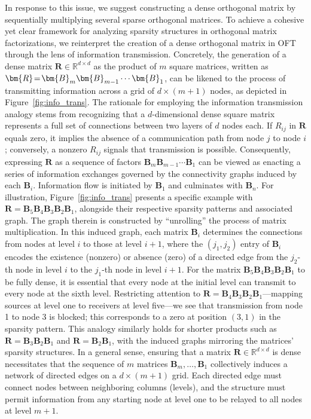 In response to this issue, we suggest constructing a dense orthogonal matrix by sequentially multiplying several sparse orthogonal matrices. To achieve a cohesive yet clear framework for analyzing sparsity structures in orthogonal matrix factorizations, we reinterpret the creation of a dense orthogonal matrix in OFT through the lens of information transmission. Concretely, the generation of a dense matrix $\bm{R}\in\mathbb{R}^{d\times d}$ as the product of $m$ square matrices, written as $\thickmuskip=2mu \medmuskip=2mu \bm{R}=\bm{B}_m\bm{B}_{m-1}\cdots\bm{B}_1$, can be likened to the process of transmitting information across a grid of $d\times (m+1)$ nodes, as depicted in Figure~\ref{fig:info_trans}. The rationale for employing the information transmission analogy stems from recognizing that a $d$-dimensional dense square matrix represents a full set of connections between two layers of $d$ nodes each. If $R_{ij}$ in $\bm{R}$ equals zero, it implies the absence of a communication path from node $j$ to node $i$; conversely, a nonzero $R_{ij}$ signals that transmission is possible. Consequently, expressing $\bm{R}$ as a sequence of factors $\bm{B}_m\bm{B}_{m-1}\cdots\bm{B}_1$ can be viewed as enacting a series of information exchanges governed by the connectivity graphs induced by each $\bm{B}_i$. Information flow is initiated by $\bm{B}_1$ and culminates with $\bm{B}_n$. For illustration, Figure~\ref{fig:info_trans} presents a specific example with $\bm{R}=\bm{B}_5\bm{B}_4\bm{B}_3\bm{B}_2\bm{B}_1$, alongside their respective sparsity patterns and associated graph. The graph therein is constructed by “unrolling” the process of matrix multiplication. In this induced graph, each matrix $\bm{B}_i$ determines the connections from nodes at level $i$ to those at level $i+1$, where the $(j_1, j_2)$ entry of $\bm{B}_i$ encodes the existence (nonzero) or absence (zero) of a directed edge from the $j_2$-th node in level $i$ to the $j_1$-th node in level $i+1$. For the matrix $\bm{B}_5\bm{B}_4\bm{B}_3\bm{B}_2\bm{B}_1$ to be fully dense, it is essential that every node at the initial level can transmit to every node at the sixth level. Restricting attention to $\bm{R}=\bm{B}_4\bm{B}_3\bm{B}_2\bm{B}_1$—mapping sources at level one to receivers at level five—we see that transmission from node 1 to node 3 is blocked; this corresponds to a zero at position $(3,1)$ in the sparsity pattern. This analogy similarly holds for shorter products such as $\bm{R}=\bm{B}_3\bm{B}_2\bm{B}_1$ and $\bm{R}=\bm{B}_2\bm{B}_1$, with the induced graphs mirroring the matrices’ sparsity structures. In a general sense, ensuring that a matrix $\bm{R}\in\mathbb{R}^{d\times d}$ is dense necessitates that the sequence of $m$ matrices $\bm{B}_m,\ldots,\bm{B}_1$ collectively induces a network of directed edges on a $d\times (m+1)$ grid. Each directed edge must connect nodes between neighboring columns (levels), and the structure must permit information from any starting node at level one to be relayed to all nodes at level $m+1$.

